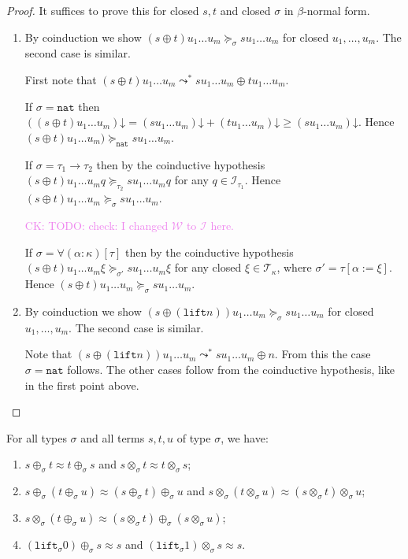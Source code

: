 \documentclass[a4paper,UKenglish,cleveref,autoref,numberwithinsect]{lipics-v2019}
\theoremstyle{definition}
\newcommand{\World}{\mathcal{W}}
\newcommand{\Iterms}{\mathcal{I}}
\newcommand{\arrtype}{\rightarrow}
\newcommand{\subst}[2]{#1:=#2}
\newcommand{\nat}{\mathtt{nat}}
\newcommand{\lift}{\mathtt{lift}}
\newcommand{\Tc}{\mathcal{T}}
\newcommand{\da}{\mathord{\downarrow}}
\newcommand{\CK}[1]{\textcolor{violet}{CK: #1}}
\begin{document}
\begin{proof}
  It suffices to prove this for closed $s,t$ and closed $\sigma$ in
  $\beta$-normal form.
  \begin{enumerate}
  \item By coinduction we show $(s \oplus t) u_1 \ldots u_m
    \succeq_\sigma s u_1 \ldots u_m$ for closed $u_1,\ldots,u_m$. The
    second case is similar.

    First note that $(s \oplus t) u_1 \ldots u_m \leadsto^* s u_1
    \ldots u_m \oplus t u_1 \ldots u_m$.

    If $\sigma = \nat$ then $((s \oplus t) u_1 \ldots u_m)\da = (s u_1
    \ldots u_m)\da + (t u_1 \ldots u_m)\da \ge (s u_1 \ldots
    u_m)\da$. Hence $(s \oplus t) u_1 \ldots u_m) \succeq_\nat s u_1
    \ldots u_m$.

    If $\sigma = \tau_1\arrtype\tau_2$ then by the coinductive
    hypothesis $(s \oplus t) u_1 \ldots u_m q \succeq_{\tau_2} s u_1
    \ldots u_m q$ for any $q \in \Iterms_{\tau_1}$. Hence $(s \oplus t)
    u_1 \ldots u_m \succeq_\sigma s u_1 \ldots u_m$.

    \CK{TODO: check: I changed $\World$ to $\Iterms$ here.}

    If $\sigma = \forall(\alpha:\kappa)[\tau]$ then by the coinductive
    hypothesis $(s \oplus t) u_1 \ldots u_m \xi \succeq_{\sigma'} s
    u_1 \ldots u_m \xi$ for any closed $\xi \in \Tc_\kappa$, where
    $\sigma' = \tau[\subst{\alpha}{\xi}]$. Hence $(s \oplus t) u_1
    \ldots u_m \succeq_\sigma s u_1 \ldots u_m$.
  \item By coinduction we show $(s \oplus (\lift n)) u_1 \ldots u_m
    \succeq_\sigma s u_1 \ldots u_m$ for closed $u_1,\ldots,u_m$. The
    second case is similar.

    Note that $(s \oplus (\lift n)) u_1 \ldots u_m \leadsto^* s u_1
    \ldots u_m \oplus n$. From this the case $\sigma=\nat$
    follows. The other cases follow from the coinductive hypothesis,
    like in the first point above.\qedhere
  \end{enumerate}
\end{proof}

{ \renewcommand{\thelemma}{\ref{lem:approxproperties}}
\begin{lemma}
For all types $\sigma$ and all terms $s,t,u$ of type $\sigma$, we
have:
\begin{enumerate}
\item $s \oplus_\sigma t \approx t \oplus_\sigma s$ and $s
  \otimes_\sigma t \approx t \otimes_\sigma s$;
\item $s \oplus_\sigma (t \oplus_\sigma u) \approx (s \oplus_\sigma t)
  \oplus_\sigma u$ and $s \otimes_\sigma (t \otimes_\sigma u) \approx
  (s \otimes_\sigma t) \otimes_\sigma u$;
\item $s \otimes_\sigma (t \oplus_\sigma u) \approx (s \otimes_\sigma
  t) \oplus_\sigma (s \otimes_\sigma u)$;
\item $(\lift_\sigma 0) \oplus_\sigma s \approx s$ and $(\lift_\sigma
  1) \otimes_\sigma s \approx s$.
\end{enumerate}
\end{lemma}
\addtocounter{theorem}{-1}}
\end{document}

